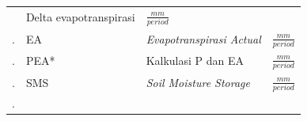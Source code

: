 \documentclass[11pt]{article}
\begin{document}
\begin{longtable}[]{@{}lllc@{}}
\begin{minipage}[t]{0.22\columnwidth}
\end{minipage} & \begin{minipage}[t]{0.22\columnwidth}\raggedright
Delta evapotranspirasi\strut
\end{minipage} & \begin{minipage}[t]{0.22\columnwidth}\centering
\(\frac{mm}{period}\)\strut
\end{minipage}\tabularnewline
\begin{minipage}[t]{0.22\columnwidth}\raggedright
.\strut
\end{minipage} & \begin{minipage}[t]{0.22\columnwidth}\raggedright
EA\strut
\end{minipage} & \begin{minipage}[t]{0.22\columnwidth}\raggedright
\emph{Evapotranspirasi Actual}\strut
\end{minipage} & \begin{minipage}[t]{0.22\columnwidth}\centering
\(\frac{mm}{period}\)\strut
\end{minipage}\tabularnewline
\begin{minipage}[t]{0.22\columnwidth}\raggedright
.\strut
\end{minipage} & \begin{minipage}[t]{0.22\columnwidth}\raggedright
PEA*\strut
\end{minipage} & \begin{minipage}[t]{0.22\columnwidth}\raggedright
Kalkulasi P dan EA\strut
\end{minipage} & \begin{minipage}[t]{0.22\columnwidth}\centering
\(\frac{mm}{period}\)\strut
\end{minipage}\tabularnewline
\begin{minipage}[t]{0.22\columnwidth}\raggedright
.\strut
\end{minipage} & \begin{minipage}[t]{0.22\columnwidth}\raggedright
SMS\strut
\end{minipage} & \begin{minipage}[t]{0.22\columnwidth}\raggedright
\emph{Soil Moisture Storage}\strut
\end{minipage} & \begin{minipage}[t]{0.22\columnwidth}\centering
\(\frac{mm}{period}\)\strut
\end{minipage}\tabularnewline
\begin{minipage}[t]{0.22\columnwidth}\raggedright
.\strut
\end{minipage} & \begin{minipage}[t]{0.22\columnwidth}\raggedright

\end{minipage}
\end{longtable}
\end{document}

